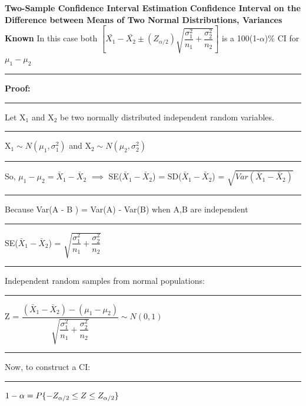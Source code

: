\documentclass[]{article}
\begin{document}
\newline 
\newline 
\Large\textbf{Two-Sample Confidence Interval Estimation}
\newline
\Large\textbf{Confidence Interval on the Difference between Means of Two Normal Distributions, Variances Known}
\newline In this case both 
\newline
\newline
$\left[ \bar{X_{1}} - \bar{X_{2}} \pm \left( Z_{\alpha / 2}  \right) \sqrt{\dfrac{\sigma^2_1}{n_1} + \dfrac{\sigma^2_2}{n_2}    }      \right] $ is a 100(1-$\alpha$)$\%$ CI for $\mu_1 - \mu_2$ 
\newline 
\newline
\newline\Large\rule{3.0cm}{0pt} \textbf{Proof:}
\newline\Large\rule{3.0cm}{0pt} Let X$_1$ and X$_2$ be two normally distributed independent random variables.
\newline\Large\rule{3.0cm}{0pt} X$_1 \sim N( \mu_1, \sigma^2_1 )$  and X$_2 \sim N( \mu_2, \sigma^2_2 )$ 
\newline\Large\rule{3.0cm}{0pt} So, $\mu_1 - \mu_2 = \bar{X}_1 - \bar{X}_2$ $\implies$ SE($\bar{X}_1 - \bar{X}_2$) = SD($\bar{X}_1 - \bar{X}_2$) = $\sqrt{Var(\bar{X}_1 - \bar{X}_2 )}$
\newline\newline\Large\rule{3.0cm}{0pt} Because Var(A - B ) = Var(A) - Var(B) when A,B are independent
\newline\newline\Large\rule{3.0cm}{0pt} SE($\bar{X}_1 - \bar{X}_2$) = $\sqrt{\dfrac{\sigma^2_1}{n_1} + \dfrac{\sigma^2_2}{n_2} }$
\newline\newline\Large\rule{3.0cm}{0pt} Independent random samples from normal populations:
\newline\newline\Large\rule{3.0cm}{0pt} Z = $\dfrac{  (  \bar{X}_1 - \bar{X}_2 )  -  (\mu_1 - \mu_2)   }{\sqrt{\dfrac{\sigma^2_1}{n_1} + \dfrac{\sigma^2_2}{n_2} }} \sim N(0,1)$
\newline\newline\Large\rule{3.0cm}{0pt}  Now, to construct a CI:
\newline\Large\rule{3.0cm}{0pt} $1 - \alpha = P \{ -Z_{\alpha\\/2} \le Z \le Z_{\alpha\\/2}  \}$
\end{document}
